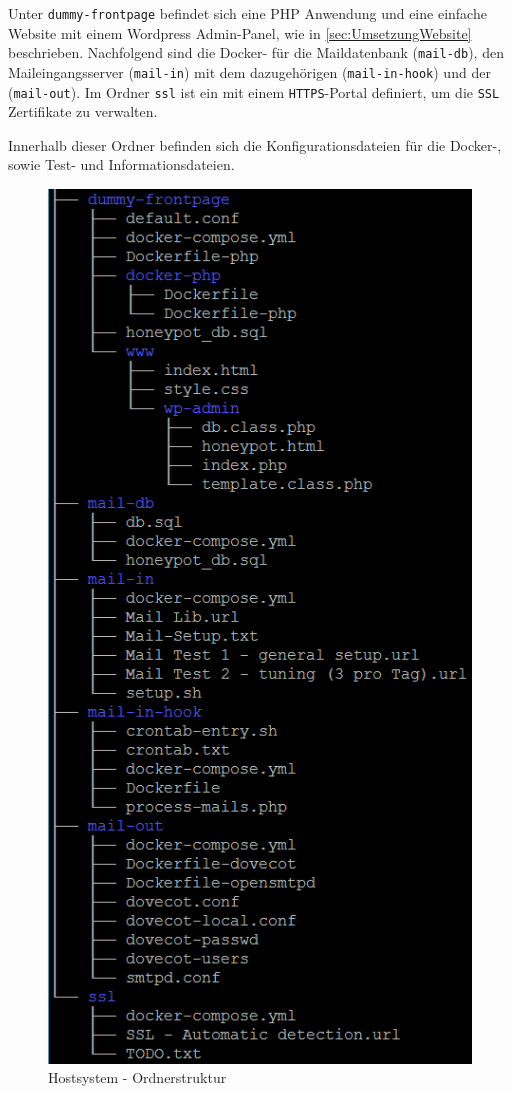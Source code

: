 \documentclass[a4paper,11pt,singlespacing]{article}
\begin{document}
			Unter \texttt{dummy-frontpage} befindet sich eine PHP Anwendung und eine einfache Website mit einem Wordpress Admin-Panel, wie in \autoref{sec:UmsetzungWebsite} beschrieben. 
			Nachfolgend sind die Docker- für die Maildatenbank (\texttt{mail-db}), den Maileingangsserver (\texttt{mail-in}) mit dem dazugehörigen  (\texttt{mail-in-hook}) und der  (\texttt{mail-out}). Im Ordner \texttt{ssl} ist ein  mit einem \texttt{HTTPS}-Portal definiert, um die \texttt{SSL} Zertifikate zu verwalten.
			
			Innerhalb dieser Ordner befinden sich die Konfigurationsdateien für die Docker-, sowie Test- und Informationsdateien.
	\begin{figure}[H]
		\centering
		\includegraphics[scale=0.9]{hostTree.png}
	 	\caption{Hostsystem - Ordnerstruktur}
		\label{fig:HostsystemOrdnerstruktur}
	\end{figure}	
	
\end{document}

